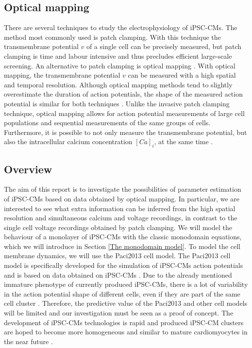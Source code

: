 \documentclass[12pt,a4paper]{article}
\begin{document}
\subsection{Optical mapping}
There are several techniques to study the electrophysiology of iPSC-CMs. The method most commonly used is patch clamping. With this technique the transmembrane potential $v$ of a single cell can be precisely measured, but patch clamping is time and labour intensive and thus precludes efficient large-scale screening. An alternative to patch clamping is optical mapping \cite{Denning2016}. With optical mapping, the transmembrane potential $v$ can be measured with a high spatial and temporal resolution. Although optical mapping methods tend to slightly overestimate the duration of action potentials, the shape of the measured action potential is similar for both techniques \cite[Figure 2]{Leyton2014}. Unlike the invasive patch clamping technique, optical mapping allows for action potential measurements of large cell populations and sequential measurements of the same groups of cells. Furthermore, it is possible to not only measure the transmembrane potential, but also the intracellular calcium concentration $[Ca]_i$, at the same time \cite{Lee2012}. 
\subsection{Overview}
The aim of this report is to investigate the possibilities of parameter estimation of iPSC-CMs based on data obtained by optical mapping. In particular, we are interested to see what extra information can be inferred from the high spatial resolution and simultaneous calcium and voltage recordings, in contrast to the single cell voltage recordings obtained by patch clamping. We will model the behaviour of a monolayer of iPSC-CMs with the classic monodomain equations, which we will introduce in Section \ref{The monodomain model}. To model the cell membrane dynamics, we will use the Paci2013 cell model. The Paci2013 cell model is specifically developed for the simulation of iPSC-CMs action potentials and is based on data obtained on iPSC-CMs \cite{Paci2013, Ma2011}. Due to the already mentioned immature phenotype of currently produced iPSC-CMs, there is a lot of variability in the action potential shape of different cells, even if they are part of the same cell cluster \cite{Blazeski, Zhu2016}. Therefore, the predictive value of the Paci2013 and other cell models will be limited and our investigation must be seen as a proof of concept. The development of iPSC-CMs technologies is rapid and produced iPSC-CM clusters are hoped to become more homogeneous and similar to mature cardiomyocytes in the near future \cite{Denning2016}. 
\end{document}
